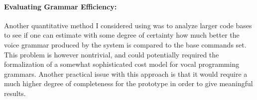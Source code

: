 \documentclass[../thesis.tex]{subfiles}
\begin{document}
\paragraph{Evaluating Grammar Efficiency:}
Another quantitative method I considered using was to analyze larger code bases
to see if one can estimate with some degree of certainty how much better the voice grammar
produced by the system is compared to the base commands set.
This problem is however nontrivial, and could potentially
required the formalization of a somewhat sophisticated cost model for vocal programming grammars. %
Another practical issue with this approach is that it would require a much higher degree of completeness for the prototype
in order to give meaningful results.



\end{document}

